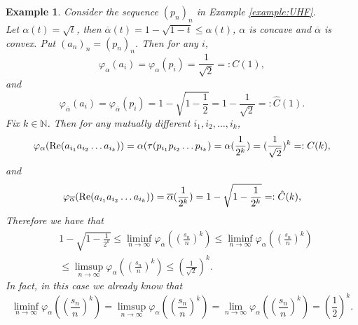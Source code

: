 \documentclass[a4paper,12pt]{amsart}
\newtheorem{example}[definition]{Example}
\newcommand{\N}{\mathbb{N}}
\begin{document}
\begin{example} \rm
Consider the sequence $(p_n)_n$ in Example \ref{example:UHF}.  \\
Let $\alpha(t) ={\sqrt t}$, then  $\overline{\alpha}(t) = 1 - {\sqrt {1-t}} \leq \alpha(t)$, $\alpha$ is concave and $\overline{\alpha}$ 
is convex.  Put $(a_n)_n = (p_n)_n$.  Then for any $i$, 
$$
\varphi_{\alpha}(a_i) = \varphi_{\alpha}(p_i) = \frac{1}{\sqrt 2} =: C(1), 
$$
and 
$$
\varphi_{\overline{\alpha}}(a_i) = \varphi_{\overline{\alpha}}(p_i) = 1- \sqrt {1-\frac{1}{2} }
= 1 - \frac{1}{\sqrt 2} =:{\hat C}(1).
$$
Fix $k \in  \N$. Then for any mutually different $i_1, i_2, \dots, i_k$, 
$$
\varphi_{\alpha}({\rm Re} (a_{i_1}a_{i_2} \dots a_{i_k}) ) = \alpha(\tau(p_{i_1}p_{i_2} \dots p_{i_k}) = 
\alpha(\frac{1}{2^k}) = (\frac{1}{\sqrt 2})^k =: C(k), 
$$
and  
$$
\varphi_{\overline{\alpha}}({\rm Re} (a_{i_1}a_{i_2} \dots a_{i_k}) ) =  
\overline{\alpha}(\frac{1}{2^k}) =1- \sqrt {1-\frac{1}{2^k} }=:{\hat C}(k), 
$$  
Therefore  we have that
\begin{align*}
& 1- \sqrt {1-\frac{1}{2^k} } \leq \liminf _{n \to \infty}  \varphi_{\overline{\alpha}}((\frac{s_n}{n})^k) 
\leq \liminf _{n \to \infty}  \varphi_{\alpha}((\frac{s_n}{n})^k)\\ 
& \leq  \limsup _{n \to \infty}  \varphi_{\alpha}((\frac{s_n}{n})^k) \leq (\frac{1}{\sqrt 2})^k. 
\end{align*}
In fact, in this case we already know that 
\[
\liminf _{n \to \infty}  \varphi_{\alpha}((\frac{s_n}{n})^k) =  \limsup _{n \to \infty}  \varphi_{\alpha}((\frac{s_n}{n})^k)
= \lim  _{n \to \infty}  \varphi_{\alpha}((\frac{s_n}{n})^k) = (\frac{1}{2})^k. 
\]
\end{example}
\end{document}
